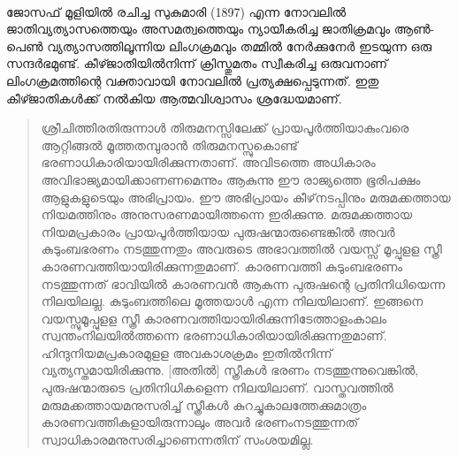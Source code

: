 \paragraph{}ജോസഫ് മൂളിയിൽ രചിച്ച സുകുമാരി (1897) എന്ന നോവലിൽ ജാതിവ്യത്യാസത്തെയും അസമത്വത്തെയും ന്യായീകരിച്ച ജാതിക്രമവും ആൺ-പെൺ വ്യത്യാസത്തിലൂന്നിയ ലിംഗക്രമവും തമ്മിൽ നേർക്കുനേർ ഇടയുന്ന ഒരു സന്ദർഭമുണ്ട്. കീഴ്ജാതിയിൽനിന്ന് ക്രിസ്തുമതം സ്വീകരിച്ച ഒരുവനാണ് ലിംഗക്രമത്തിന്റെ വക്താവായി നോവലിൽ പ്രത്യക്ഷപ്പെടുന്നത്. ഇതു കീഴ്ജാതികൾക്ക് നൽകിയ ആത്മവിശ്വാസം ശ്രദ്ധേയമാണ്.

\begin{quotation}
\noindent ശ്രീചിത്തിരതിരുന്നാൾ തിരുമനസ്സിലേക്ക് പ്രായപൂർത്തിയാകുംവരെ ആറ്റിങ്ങൽ മൂത്തതമ്പുരാൻ തിരുമനസ്സുകൊണ്ട് ഭരണാധികാരിയായിരിക്കുന്നതാണ്. അവിടത്തെ അധികാരം അവിഭാജ്യമായിക്കാണണമെന്നും ആകുന്നു ഈ രാജ്യത്തെ ഭൂരിപക്ഷം ആളുകളുടെയും അഭിപ്രായം. ഈ അഭിപ്രായം കീഴ്‌നടപ്പിനും മരുമക്കത്തായ നിയമത്തിനും അനുസരണമായിത്തന്നെ ഇരിക്കുന്നു. മരുമക്കത്തായ നിയമപ്രകാരം പ്രായപൂർത്തിയായ പുരുഷന്മാരുണ്ടെങ്കിൽ അവർ കുടുംബഭരണം നടത്തുന്നതും അവരുടെ അഭാവത്തിൽ വയസ്സ് മൂപ്പുളള സ്ത്രീ കാരണവത്തിയായിരിക്കുന്നതുമാണ്. കാരണവത്തി കുടുംബഭരണം നടത്തുന്നത് ഭാവിയിൽ കാരണവൻ ആകുന്ന പുരുഷന്റെ പ്രതിനിധിയെന്ന നിലയിലല്ല. കുടുംബത്തിലെ മൂത്തയാൾ എന്ന നിലയിലാണ്. ഇങ്ങനെ വയസ്സുമൂപ്പുളള സ്ത്രീ കാരണവത്തിയായിരിക്കുന്നിടേത്താളംകാലം സ്വന്തംനിലയിൽത്തന്നെ ഭരണാധികാരിയായിരിക്കുന്നതുമാണ്. ഹിന്ദുനിയമപ്രകാരമുളള അവകാശക്രമം ഇതിൽനിന്ന് വ്യത്യസ്തമായിരിക്കുന്നു. [അതിൽ] സ്ത്രീകൾ ഭരണം നടത്തുന്നുവെങ്കിൽ, പുരുഷന്മാരുടെ പ്രതിനിധികളെന്ന നിലയിലാണ്. വാസ്തവത്തിൽ മരുമക്കത്തായമനുസരിച്ച് സ്ത്രീകൾ കുറച്ചുകാലത്തേക്കുമാത്രം കാരണവത്തികളായിരുന്നാലും അവർ ഭരണംനടത്തുന്നത് സ്വാധികാരമനുസരിച്ചാണെന്നതിന് സംശയമില്ല.
\end{quotation}


